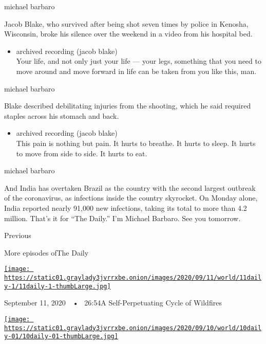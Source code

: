 michael barbaro

Jacob Blake, who survived after being shot seven times by police in
Kenosha, Wisconsin, broke his silence over the weekend in a video from
his hospital bed.

\begin{itemize}
\tightlist
\item
  archived recording (jacob blake)\\
  Your life, and not only just your life --- your legs, something that
  you need to move around and move forward in life can be taken from you
  like this, man.
\end{itemize}

michael barbaro

Blake described debilitating injuries from the shooting, which he said
required staples across his stomach and back.

\begin{itemize}
\tightlist
\item
  archived recording (jacob blake)\\
  This pain is nothing but pain. It hurts to breathe. It hurts to sleep.
  It hurts to move from side to side. It hurts to eat.
\end{itemize}

michael barbaro

And India has overtaken Brazil as the country with the second largest
outbreak of the coronavirus, as infections inside the country skyrocket.
On Monday alone, India reported nearly 91,000 new infections, taking its
total to more than 4.2 million. That's it for ``The Daily.'' I'm Michael
Barbaro. See you tomorrow.

Previous

More episodes ofThe Daily

\href{https://www.nytimes3xbfgragh.onion/2020/09/11/podcasts/the-daily/wildfires-california-fire-zones.html?action=click\&module=audio-series-bar\&region=header\&pgtype=Article}{\texttt{[image: https://static01.graylady3jvrrxbe.onion/images/2020/09/11/world/11daily-1/11daily-1-thumbLarge.jpg]}}

September 11, 2020~~•~ 26:54A Self-Perpetuating Cycle of Wildfires

\href{https://www.nytimes3xbfgragh.onion/2020/09/10/podcasts/the-daily/Breonna-Taylor.html?action=click\&module=audio-series-bar\&region=header\&pgtype=Article}{\texttt{[image: https://static01.graylady3jvrrxbe.onion/images/2020/09/10/world/10daily-01/10daily-01-thumbLarge.jpg]}}

